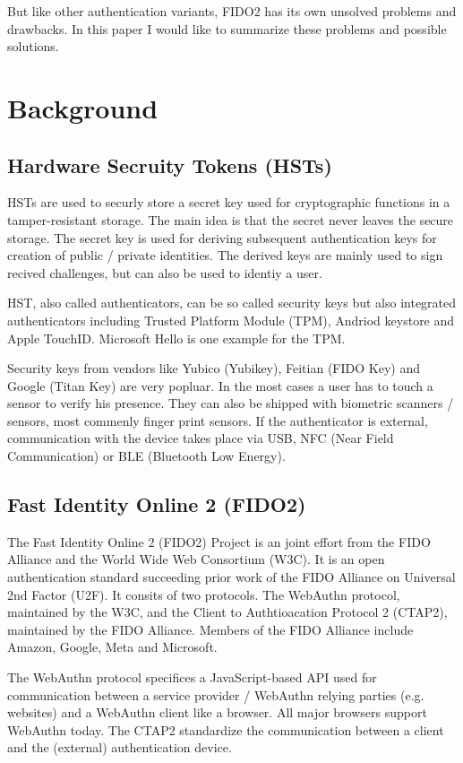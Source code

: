 \documentclass[runningheads]{llncs}
\begin{document}
But like other authentication variants, FIDO2 has its own unsolved problems and drawbacks. In this paper I would like to summarize these problems and possible solutions. 

\section{Background}
\subsection{Hardware Secruity Tokens (HSTs)}
HSTs are used to securly store a secret key used for cryptographic functions in a tamper-resistant storage. The main idea is that the secret never leaves the secure storage. The secret key is used for deriving subsequent authentication keys for creation of public / private identities. The derived keys are mainly used to sign recived challenges, but can also be used to identiy a user.\cite{272198}

HST, also called authenticators, can be so called security keys but also integrated authenticators including Trusted Platform Module (TPM), Andriod keystore and Apple TouchID. Microsoft Hello is one example for the TPM.

Security keys from vendors like Yubico (Yubikey), Feitian (FIDO Key) and Google (Titan Key) are very popluar. In the most cases a user has to touch a sensor to verify his presence. They can also be shipped with biometric scanners / sensors, most commenly finger print sensors. If the authenticator is external, communication with the device takes place via USB, NFC (Near Field Communication) or BLE (Bluetooth Low Energy).\cite{9152694}

\subsection{Fast Identity Online 2 (FIDO2)}
The Fast Identity Online 2 (FIDO2) Project is an joint effort from the FIDO Alliance and the World Wide Web Consortium (W3C). It is an open authentication standard succeeding prior work of the FIDO Alliance on Universal 2nd Factor (U2F). \cite{9152694}  It consits of two protocols. The WebAuthn protocol, maintained by the W3C, and the Client to Authtioacation Protocol 2 (CTAP2), maintained by the FIDO Alliance. Members of the FIDO Alliance include Amazon, Google, Meta and Microsoft.

The WebAuthn protocol specifices a JavaScript-based API used for
communication between a service provider / WebAuthn relying parties (e.g. websites) and a WebAuthn client like a browser. All major browsers support WebAuthn today.\cite{000001}
The CTAP2 standardize the communication between a client and the (external) authentication device.\cite{274547}\cite{9099190}
\end{document}
